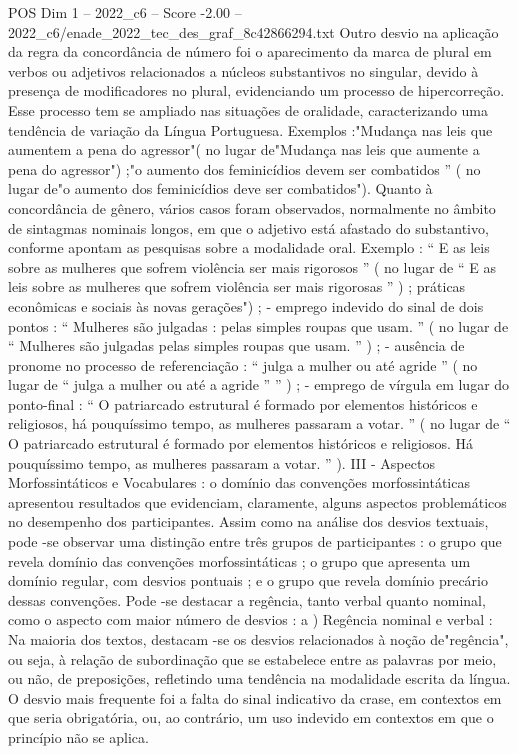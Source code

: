 \begin{textsample}{POS Dim 1 – 2022\_c6 – Score -2.00 – 2022\_c6/enade\_2022\_tec\_des\_graf\_8c42866294.txt}
Outro desvio na aplicação da regra da concordância de número foi o aparecimento da marca de plural em verbos ou adjetivos relacionados a núcleos substantivos no singular, devido à presença de modificadores no plural, evidenciando um processo de hipercorreção.
Esse processo tem se ampliado nas situações de oralidade, caracterizando uma tendência de variação da Língua Portuguesa.
Exemplos :"Mudança nas leis que aumentem a pena do agressor"( no lugar de"Mudança nas leis que aumente a pena do agressor") ;"o aumento dos feminicídios devem ser combatidos ” ( no lugar de"o aumento dos feminicídios deve ser combatidos").
Quanto à concordância de gênero, vários casos foram observados, normalmente no âmbito de sintagmas nominais longos, em que o adjetivo está afastado do substantivo, conforme apontam as pesquisas sobre a modalidade oral.
Exemplo : “ E as leis sobre as mulheres que sofrem violência ser mais rigorosos ” ( no lugar de “ E as leis sobre as mulheres que sofrem violência ser mais rigorosas ” ) ; práticas econômicas e sociais às novas gerações") ; - emprego indevido do sinal de dois pontos : “ Mulheres são julgadas : pelas simples roupas que usam. ” ( no lugar de “ Mulheres são julgadas pelas simples roupas que usam. ” ) ; - ausência de pronome no processo de referenciação : “ julga a mulher ou até agride ” ( no lugar de “ julga a mulher ou até a agride ” ” ) ; - emprego de vírgula em lugar do ponto-final : “ O patriarcado estrutural é formado por elementos históricos e religiosos, há pouquíssimo tempo, as mulheres passaram a votar. ” ( no lugar de “ O patriarcado estrutural é formado por elementos históricos e religiosos.
Há pouquíssimo tempo, as mulheres passaram a votar. ” ).
III - Aspectos Morfossintáticos e Vocabulares : o domínio das convenções morfossintáticas apresentou resultados que evidenciam, claramente, alguns aspectos problemáticos no desempenho dos participantes.
Assim como na análise dos desvios textuais, pode -se observar uma distinção entre três grupos de participantes : o grupo que revela domínio das convenções morfossintáticas ; o grupo que apresenta um domínio regular, com desvios pontuais ; e o grupo que revela domínio precário dessas convenções.
Pode -se destacar a regência, tanto verbal quanto nominal, como o aspecto com maior número de desvios : a ) Regência nominal e verbal : Na maioria dos textos, destacam -se os desvios relacionados à noção de"regência", ou seja, à relação de subordinação que se estabelece entre as palavras por meio, ou não, de preposições, refletindo uma tendência na modalidade escrita da língua.
O desvio mais frequente foi a falta do sinal indicativo da crase, em contextos em que seria obrigatória, ou, ao contrário, um uso indevido em contextos em que o princípio não se aplica.

\end{textsample}
